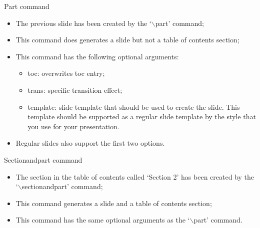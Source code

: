 \documentclass[pdf]{prosper}
\begin{document}
\begin{slide}{Part command}
\begin{itemize}
\item The previous slide has been
created by the `$\backslash$part' command;
\item This command does generates a slide but not a table of contents section;
\item This command has the following optional arguments:
\begin{itemize}
\item toc: overwrites toc entry;
\item trans: specific transition effect;
\item template: slide template that should be used to create the slide.
This template should be supported as a regular slide template by the
style that you use for your presentation.
\end{itemize}
\item Regular slides also support the first two options.
\end{itemize}
\end{slide}




\begin{slide}{Sectionandpart command}
\begin{itemize}
\item The section in the table of contents called `Section 2' has been
created by the `$\backslash$sectionandpart' command;
\item This command generates a slide and a table of contents section;
\item This command has the same optional arguments as the `$\backslash$part'
command.
\end{itemize}
\end{slide}


\end{document}
